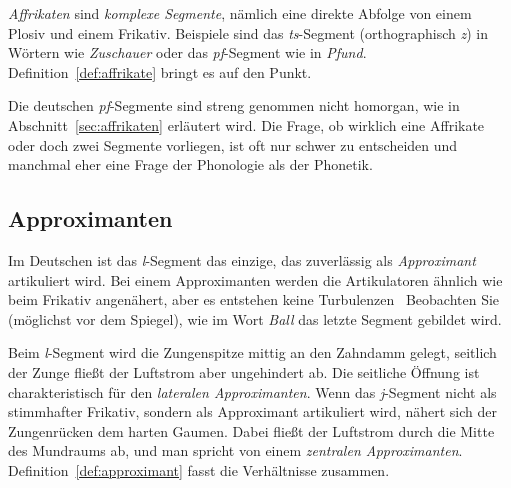 \textit{Affrikaten} sind \textit{komplexe Segmente}, nämlich eine direkte Abfolge von einem Plosiv und einem Frikativ.
Beispiele sind das \textit{ts}-Segment (orthographisch \textit{z}) in Wörtern wie \textit{Zuschauer} oder das \textit{pf}-Segment wie in \textit{Pfund}.
Definition~\ref{def:affrikate} bringt es auf den Punkt.

\Enl


Die deutschen \textit{pf}-Segmente sind \zB streng genommen nicht homorgan, wie in Abschnitt~\ref{sec:affrikaten} erläutert wird.
Die Frage, ob wirklich eine Affrikate oder doch zwei Segmente vorliegen, ist oft nur schwer zu entscheiden und manchmal eher eine Frage der Phonologie als der Phonetik.

\subsection{Approximanten}
\label{sec:approximanten}

Im Deutschen ist das \textit{l}-Segment das einzige, das zuverlässig als \textit{Approximant} artikuliert wird.
Bei einem Approximanten werden die Artikulatoren ähnlich wie beim Frikativ angenähert, aber es entstehen keine Turbulenzen
\TuBegin~Beobachten Sie (möglichst vor dem Spiegel), wie im Wort \textit{Ball} das letzte Segment gebildet wird.

Beim \textit{l}-Segment wird die Zungenspitze mittig an den Zahndamm gelegt, seitlich der Zunge fließt der Luftstrom aber ungehindert ab.
Die seitliche Öffnung ist charakteristisch für den \textit{lateralen Approximanten}.
Wenn das \textit{j}-Segment nicht als stimmhafter Frikativ, sondern als Approximant artikuliert wird, nähert sich der Zungenrücken dem harten Gaumen.
Dabei fließt der Luftstrom durch die Mitte des Mundraums ab, und man spricht von einem \textit{zentralen Approximanten}.
Definition~\ref{def:approximant} fasst die Verhältnisse zusammen.


